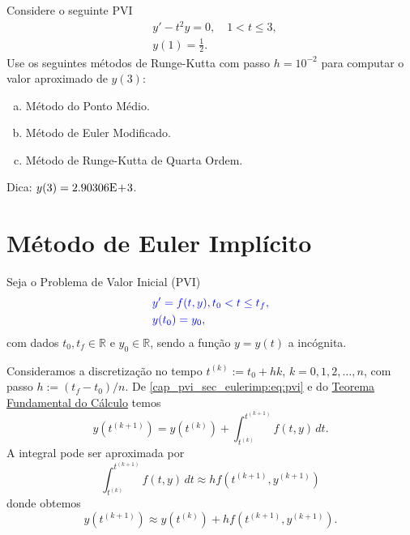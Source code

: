\begin{exer}
  Considere o seguinte PVI
  \begin{subequations}
    \begin{align}
      &y' - t^2y = 0,\quad 1 < t \leq 3,\\
      &y(1) = \frac{1}{2}.
    \end{align}
  \end{subequations}
  Use os seguintes métodos de Runge-Kutta com passo $h=10^{-2}$ para computar o valor aproximado de $y(3)$:
  \begin{enumerate}[a)]
  \item Método do Ponto Médio.
  \item Método de Euler Modificado.
  \item Método de Runge-Kutta de Quarta Ordem.
  \end{enumerate}
\end{exer}
\begin{resp}
  Dica: $y(3) = 2.90306\mathrm{E}\!+\!3$.
\end{resp}

\section{Método de Euler Implícito}\label{cap_pvi_sec_eulerimp}

Seja o Problema de Valor Inicial (PVI)
\begin{subequations}\label{cap_pvi_sec_eulerimp:eq:pvi}\hleq
  \begin{align}
    &y' = f(t, y), t_0 < t \leq t_f,\\
    &y(t_0) = y_0,
  \end{align}
\end{subequations}
com dados $t_0, t_f\in\mathbb{R}$ e $y_0\in\mathbb{R}$, sendo a função $y = y(t)$ a incógnita.

Consideramos a discretização no tempo $t^{(k)} := t_0 + hk$, $k = 0, 1, 2, \dotsc, n$, com passo $h := (t_f-t_0)/n$. De \eqref{cap_pvi_sec_eulerimp:eq:pvi} e do \href{https://pt.wikipedia.org/wiki/Teorema_fundamental_do_c%C3%A1lculo}{Teorema Fundamental do Cálculo} temos
\begin{equation}
  y\left(t^{(k+1)}\right) = y\left(t^{(k)}\right) + \int_{t^{(k)}}^{t^{(k+1)}} f(t, y)\,dt.
\end{equation}
A integral pode ser aproximada por
\begin{equation}
  \int_{t^{(k)}}^{t^{(k+1)}} f(t, y)\,dt \approx hf\left(t^{(k+1)}, y^{(k+1)}\right)
\end{equation}
donde obtemos
\begin{equation}
  y\left(t^{(k+1)}\right) \approx y\left(t^{(k)}\right) + hf\left(t^{(k+1)}, y^{(k+1)}\right).
\end{equation}

